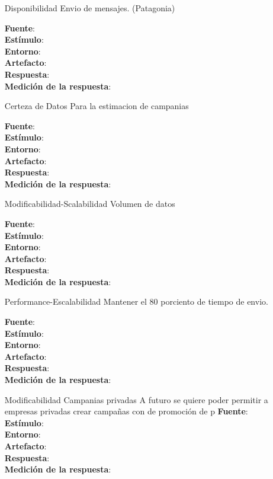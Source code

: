 \documentclass[a4paper, 11pt]{article}
\begin{document}
\begin{itemize}
\item[Disponibilidad] Envio de mensajes. (Patagonia)


\textbf{Fuente}:  \\
\textbf{Estímulo}: \\
\textbf{Entorno}: \\
\textbf{Artefacto}: \\
\textbf{Respuesta}: \\
\textbf{Medición de la respuesta}: \\


\item[Certeza de Datos] Para la estimacion de campanias

\textbf{Fuente}:  \\
\textbf{Estímulo}: \\
\textbf{Entorno}: \\
\textbf{Artefacto}: \\
\textbf{Respuesta}: \\
\textbf{Medición de la respuesta}: \\

\item[Modificabilidad-Scalabilidad] Volumen de datos


\textbf{Fuente}:  \\
\textbf{Estímulo}: \\
\textbf{Entorno}: \\
\textbf{Artefacto}: \\
\textbf{Respuesta}: \\
\textbf{Medición de la respuesta}: \\

\item[Performance-Escalabilidad] Mantener el 80 porciento de tiempo de envio.

\textbf{Fuente}:  \\
\textbf{Estímulo}: \\
\textbf{Entorno}: \\
\textbf{Artefacto}: \\
\textbf{Respuesta}: \\
\textbf{Medición de la respuesta}: \\

\item[Modificabilidad] Campanias privadas
A futuro se quiere poder permitir a empresas privadas crear campañas con de promoción de p
\textbf{Fuente}:  
\textbf{Estímulo}: \\
\textbf{Entorno}: \\
\textbf{Artefacto}: \\
\textbf{Respuesta}: \\
\textbf{Medición de la respuesta}: \\


\end{itemize}
\end{document}
